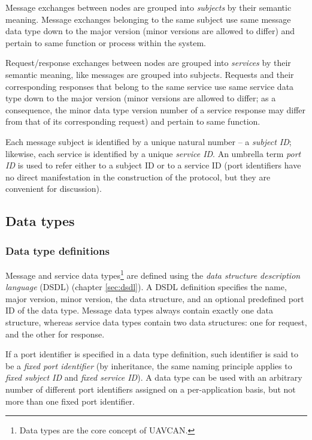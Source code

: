 Message exchanges between nodes are grouped into \emph{subjects} by their semantic meaning.
Message exchanges belonging to the same subject use same message data type down to the major version
(minor versions are allowed to differ) and pertain to same function or process within the system.

Request/response exchanges between nodes are grouped into \emph{services} by their semantic meaning,
like messages are grouped into subjects.
Requests and their corresponding responses that belong to the same service use same service data type down to
the major version (minor versions are allowed to differ; as a consequence, the minor data type version number
of a service response may differ from that of its corresponding request) and pertain to same function.

Each message subject is identified by a unique natural number -- a \emph{subject ID};
likewise, each service is identified by a unique \emph{service ID}.
An umbrella term \emph{port ID} is used to refer either to a subject ID or to a service ID
(port identifiers have no direct manifestation in the construction of the protocol,
but they are convenient for discussion).

\subsection{Data types}

\subsubsection{Data type definitions}

Message and service data types\footnote{Data types are the core concept of UAVCAN.}
are defined using the \emph{data structure description language} (DSDL) (chapter \ref{sec:dsdl}).
A DSDL definition specifies the name, major version, minor version, the data structure,
and an optional predefined port ID of the data type.
Message data types always contain exactly one data structure, whereas
service data types contain two data structures: one for request, and the other for response.

If a port identifier is specified in a data type definition, such identifier is said to be a
\emph{fixed port identifier}
(by inheritance, the same naming principle applies to \emph{fixed subject ID} and \emph{fixed service ID}).
A data type can be used with an arbitrary number of different port identifiers assigned on a per-application basis,
but not more than one fixed port identifier.


